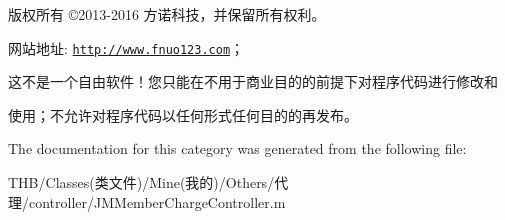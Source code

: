 版权所有 ©2013-\/2016 方诺科技，并保留所有权利。

网站地址\+: \href{http://www.fnuo123.com}{\tt http\+://www.\+fnuo123.\+com}； 



这不是一个自由软件！您只能在不用于商业目的的前提下对程序代码进行修改和

使用；不允许对程序代码以任何形式任何目的的再发布。 

 

The documentation for this category was generated from the following file\+:\begin{DoxyCompactItemize}
\item 
T\+H\+B/\+Classes(类文件)/\+Mine(我的)/\+Others/代理/controller/J\+M\+Member\+Charge\+Controller.\+m\end{DoxyCompactItemize}
